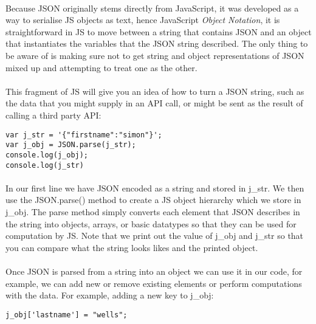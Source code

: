 \documentclass[10pt, a4paper, twosize]{article}
\begin{document}
\paragraph{} Because JSON originally stems directly from JavaScript, it was developed as a way to serialise JS objects as text, hence JavaScript \emph{Object Notation}, it is straightforward in JS to move between a string that contains JSON and an object that instantiates the variables that the JSON string described. The only thing to be aware of is making sure not to get string and object representations of JSON mixed up and attempting to treat one as the other.

\paragraph{} This fragment of JS will give you an idea of how to turn a JSON string, such as the data that you might supply in an API call, or might be sent as the result of calling a third party API:

\begin{lstlisting}
var j_str = '{"firstname":"simon"}';
var j_obj = JSON.parse(j_str);
console.log(j_obj);
console.log(j_str)
\end{lstlisting}

\paragraph{} In our first line we have JSON encoded as a string and stored in j\_str. We then use the JSON.parse() method to create a JS object hierarchy which we store in j\_obj. The parse method simply converts each element that JSON describes in the string into objects, arrays, or basic datatypes so that they can be used for computation by JS. Note that we print out the value of j\_obj and j\_str so that you can compare what the string looks likes and the printed object.

\paragraph{} Once JSON is parsed from a string into an object we can use it in our code, for example, we can add new or remove existing elements or perform computations with the data. For example, adding a new key to j\_obj:

\begin{lstlisting}
j_obj['lastname'] = "wells";
\end{lstlisting}
\end{document}

